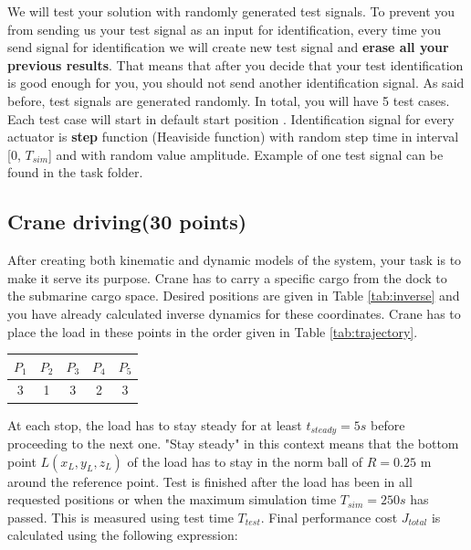 \documentclass{article}
\begin{document}
	We will test your solution with randomly generated test signals. To prevent you from sending us your test signal as an input for identification, every time you send signal for identification we will create new test signal and \textbf{erase all your previous results}. That means that after you decide that your test identification is good enough for you, you should not send another identification signal.
	As said before, test signals are generated randomly. In total, you will have 5 test cases.  Each test case will start in default start position . 
	Identification signal for every actuator is \textbf{step} function  (Heaviside function) with random step time in interval [0, $T_{sim}$] and with random value amplitude. Example of one test signal can be found in the task folder.
	
	\subsection{Crane driving(30 points)}
	
	After creating both kinematic and dynamic models of the system, your task is to make it serve its purpose. Crane has to carry a specific cargo from the dock to the submarine cargo space. Desired positions are given in Table \ref{tab:inverse} and you have already calculated inverse dynamics for these coordinates. Crane has to place the load in these points in the order given in Table \ref{tab:trajectory}.
	
	\begin{center}
		\label{tab:trajectory}
		\begin{tabular}{|| c c c c c ||}
			\hline
			$P_1$ & $P_2$ & $P_3$ & $P_4$ & $P_5$\\
			\hline\hline
			3 & 1 & 3 & 2 & 3  \\ 
			\hline
		\end{tabular}
	\end{center}
	
	\noindent
	At each stop, the load has to stay steady for at least $t_{steady} = 5s$ before proceeding to the next one. "Stay steady" in this context means that the bottom point $L(x_L,y_L,z_L)$ of the load has to stay in the norm ball of $R = 0.25$ m around the reference point. Test is finished after the load has been in all requested positions or when the maximum simulation time $T_{sim} = 250s$ has passed. This is measured using test time $T_{test}$. Final performance cost $J_{total}$ is calculated using the following expression:
	
\end{document}
